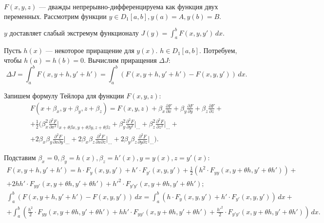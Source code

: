 
$F(x, y, z)$ --- дважды непрерывно-дифференцируема как функция двух переменных. Рассмотрим функции $y \in D_1[a, b], y(a) = A, y(b) = B$. 

$y$ доставляет слабый экстремум функционалу $J(y) = \int_{a}^{b} F(x, y, y') \, dx$. 

Пусть $h(x)$ --- некоторое приращение для $y(x)$. $h \in D_1[a, b]$. Потребуем, чтобы $h(a) = h(b) = 0$. Вычислим приращения $\Delta J$:
\begin{equation*}
	\Delta J = \int_{a}^{b} F(x, y + h, y' + h') = \int_{a}^{b} (F(x, y + h, y' + h') - F(x, y, y')) \, dx.
\end{equation*}

Запишем формулу Тейлора для функции $F(x, y, z)$: 
\begin{gather*}
	F(x + \beta_x, y + \beta_y, z + \beta_z) = F(x, y, z) + \beta_x \frac{\partial F}{\partial x} + \beta_y \frac{\partial F}{\partial y} + \beta_z \frac{\partial F}{\partial z} +  \\
	+ \frac{1}{2} \Big(\beta_x^2 \frac{\partial^2 F}{\partial x^2} \Big|_{x + \theta \beta x, y + \theta \beta y, z + \theta \beta z} + \beta_y^2 \frac{\partial^2 F}{\partial y^2} \Big|_{\dotsc} + \beta_z^2 \frac{\partial^2 F}{\partial z^2} \Big|_{\dotsc} + \\ 
	+ 2 \beta_x \beta_y \frac{\partial^2 F}{\partial x \partial y} \Big|_{\dotsc} + 2 \beta_x \beta_z \frac{\partial^2 F}{\partial x \partial z} \Big|_{\dotsc} + 2 \beta_y \beta_z \frac{\partial^2 F}{\partial y \partial z} \Big|_{\dotsc}\Big).
\end{gather*}

Подставим $\beta_x = 0, \beta_y = h(x), \beta_z = h'(x), y = y(x), z = y'(x):$
\begin{gather*}
	F(x, y + h, y' + h') = h \cdot F_y(x, y, y') + h' \cdot F_{y'}(x, y, y') + \frac{1}{2} (h^2 \cdot F_{y y}(x, y + \theta h, y' + \theta h')) + \\
	+ 2 h h' \cdot F_{y y'}(x, y + \theta h, y' + \theta h') + h'^2 \cdot F_{y'y'}(x, y + \theta h, y' + \theta h'); \\
	\int_{a}^{b} (F(x, y + h, y' + h') - F(x, y, y')) \, dx = \int_{a}^{b} (h \cdot F_y(x, y, y') + h' \cdot F_{y'}(x, y, y')) \, dx + \\
	+ \int_{a}^{b} \left(\frac{h^2}{2} \cdot F_{y y}(x, y + \theta h, y' + \theta h') + h h' \cdot F_{y y'}(x, y + \theta h, y' + \theta h') + \frac{h'^2}{2} \cdot F_{y' y'} (x, y + \theta h, y' + \theta h')\right) \, dx.
\end{gather*}

